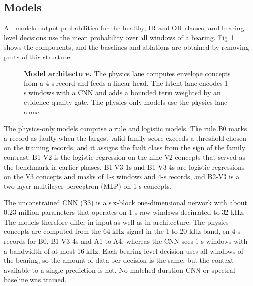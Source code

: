 \documentclass[10pt,letterpaper]{article}
\begin{document}
\subsection*{Models}
All models output probabilities for the healthy, IR and OR classes, and bearing-level decisions use the mean probability over all windows of a bearing. Fig~\ref{fig2} shows the components, and the baselines and ablations are obtained by removing parts of this structure.

\begin{figure}[!h]
\caption{\textbf{Model architecture.} The physics lane computes envelope concepts from a 4-s record and feeds a linear head. The latent lane encodes 1-s windows with a CNN and adds a bounded term weighted by an evidence-quality gate. The physics-only models use the physics lane alone.}
\label{fig2}
\end{figure}

The physics-only models comprise a rule and logistic models. The rule B0 marks a record as faulty when the largest valid family score exceeds a threshold chosen on the training records, and it assigns the fault class from the sign of the family contrast. B1-V2 is the logistic regression on the nine V2 concepts that served as the benchmark in earlier phases. B1-V3-1s and B1-V3-4s are logistic regressions on the V3 concepts and masks of 1-s windows and 4-s records, and B2-V3 is a two-layer multilayer perceptron (MLP) on 1-s concepts.

The unconstrained CNN (B3) is a six-block one-dimensional network with about 0.23 million parameters that operates on 1-s raw windows decimated to 32 kHz. The models therefore differ in input as well as in architecture. The physics concepts are computed from the 64-kHz signal in the 1 to 20 kHz band, on 4-s records for B0, B1-V3-4s and A1 to A4, whereas the CNN sees 1-s windows with a bandwidth of at most 16 kHz. Each bearing-level decision uses all windows of the bearing, so the amount of data per decision is the same, but the context available to a single prediction is not. No matched-duration CNN or spectral baseline was trained.
\end{document}
